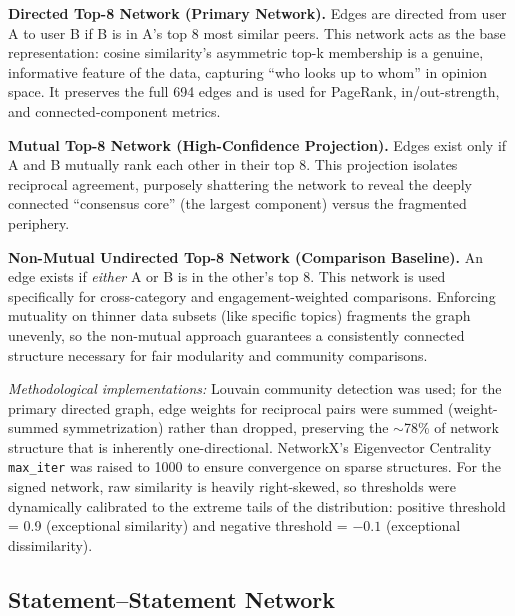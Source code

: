 \documentclass[11pt]{article}
\begin{document}
\textbf{Directed Top-8 Network (Primary Network).}
Edges are directed from user A to user B if B is in A's top 8 most similar peers. This
network acts as the base representation: cosine similarity's asymmetric top-k membership
is a genuine, informative feature of the data, capturing ``who looks up to whom'' in
opinion space. It preserves the full 694 edges and is used for PageRank, in/out-strength,
and connected-component metrics.

\textbf{Mutual Top-8 Network (High-Confidence Projection).}
Edges exist only if A and B mutually rank each other in their top 8. This projection
isolates reciprocal agreement, purposely shattering the network to reveal the deeply
connected ``consensus core'' (the largest component) versus the fragmented periphery.

\textbf{Non-Mutual Undirected Top-8 Network (Comparison Baseline).}
An edge exists if \emph{either} A or B is in the other's top 8. This network is used
specifically for cross-category and engagement-weighted comparisons. Enforcing mutuality
on thinner data subsets (like specific topics) fragments the graph unevenly, so the non-mutual approach guarantees a consistently
connected structure necessary for fair modularity and community comparisons.

\textit{Methodological implementations:} Louvain community detection was used; for the primary directed graph, edge weights for
reciprocal pairs were summed (weight-summed symmetrization) rather than dropped,
preserving the $\sim$78\% of network structure that is inherently one-directional.
NetworkX's Eigenvector Centrality \texttt{max\_iter} was raised to 1000 to ensure
convergence on sparse structures. For the signed network, raw similarity is heavily
right-skewed, so thresholds were dynamically calibrated to the extreme tails of the
distribution: positive threshold = 0.9 (exceptional similarity) and negative threshold
= $-0.1$ (exceptional dissimilarity).

\subsection{Statement--Statement Network}
\end{document}
